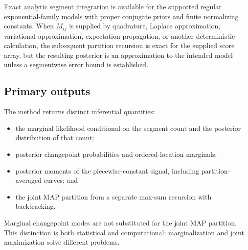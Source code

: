Exact analytic segment integration is available for the supported regular exponential-family models with proper conjugate priors and finite normalizing constants. When $M_{ij}$ is supplied by quadrature, Laplace approximation, variational approximation, expectation propagation, or another deterministic calculation, the subsequent partition recursion is exact for the supplied score array, but the resulting posterior is an approximation to the intended model unless a segmentwise error bound is established.

\subsection{Primary outputs}

The method returns distinct inferential quantities:
\begin{itemize}
  \item the marginal likelihood conditional on the segment count and the posterior distribution of that count;
  \item posterior changepoint probabilities and ordered-location marginals;
  \item posterior moments of the piecewise-constant signal, including partition-averaged curves; and
  \item the joint MAP partition from a separate max-sum recursion with backtracking.
\end{itemize}

Marginal changepoint modes are not substituted for the joint MAP partition. This distinction is both statistical and computational: marginalization and joint maximization solve different problems.
